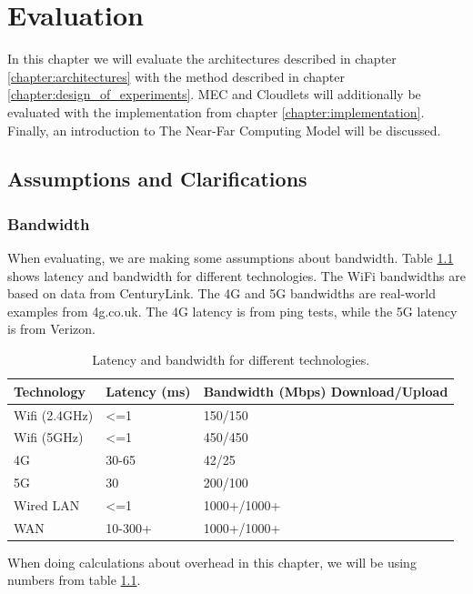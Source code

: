 \chapter{Evaluation}\label{chapter:evaluation}

In this chapter we will evaluate the architectures described in chapter \ref{chapter:architectures} with the method described in chapter \ref{chapter:design_of_experiments}. MEC and Cloudlets will additionally be evaluated with the implementation from chapter \ref{chapter:implementation}. Finally, an introduction to The Near-Far Computing Model will be discussed.






\section{Assumptions and Clarifications}
\subsection{Bandwidth}
When evaluating, we are making some assumptions about bandwidth. Table \ref{tab:Bandwidth_latency} shows latency and bandwidth for different technologies. The WiFi bandwidths are based on data from CenturyLink\cite{noauthor_24_nodate}. The 4G and 5G bandwidths are real-world examples from 4g.co.uk\cite{noauthor_how_nodate}. The 4G latency is from ping tests, while the 5G latency is from Verizon\cite{noauthor_what_2020}.
\renewcommand{\arraystretch}{1.2}
\begin{table}[h!]
    \centering
    \begin{tabular}[c]{l|p{3cm}p{4cm}}

        Technology & Latency (ms) & Bandwidth (Mbps) Download/Upload \\
        \hline

        Wifi (2.4GHz) & <=1 & 150/150  \\

        Wifi (5GHz) & <=1 & 450/450  \\

        4G & 30-65 & 42/25  \\

        5G & 30 & 200/100  \\

        Wired LAN & <=1 & 1000+/1000+  \\

        WAN & 10-300+ & 1000+/1000+  \\

        
        
    \end{tabular}
    \caption{Latency and bandwidth for different technologies.}
    \label{tab:Bandwidth_latency}
\end{table}
When doing calculations about overhead in this chapter, we will be using numbers from table \ref{tab:Bandwidth_latency}.





